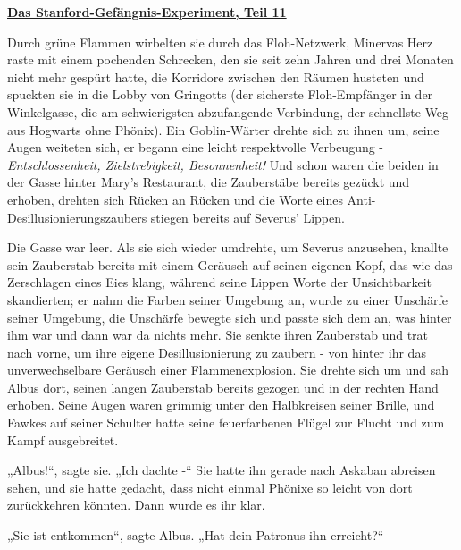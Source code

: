 

\hypertarget{das-stanford-gefuxe4ngnis-experiment-teil-11}{%

\textbf{\uline{Das Stanford-Gefängnis-Experiment, Teil 11}}

\hfill\break Durch grüne Flammen wirbelten sie durch das Floh-Netzwerk, Minervas Herz raste mit einem pochenden Schrecken, den sie seit zehn Jahren und drei Monaten nicht mehr gespürt hatte, die Korridore zwischen den Räumen husteten und spuckten sie in die Lobby von Gringotts (der sicherste Floh-Empfänger in der Winkelgasse, die am schwierigsten abzufangende Verbindung, der schnellste Weg aus Hogwarts ohne Phönix). Ein Goblin-Wärter drehte sich zu ihnen um, seine Augen weiteten sich, er begann eine leicht respektvolle Verbeugung - \emph{Entschlossenheit, Zielstrebigkeit, Besonnenheit!} Und schon waren die beiden in der Gasse hinter Mary's Restaurant, die Zauberstäbe bereits gezückt und erhoben, drehten sich Rücken an Rücken und die Worte eines Anti-Desillusionierungszaubers stiegen bereits auf Severus' Lippen.

Die Gasse war leer. Als sie sich wieder umdrehte, um Severus anzusehen, knallte sein Zauberstab bereits mit einem Geräusch auf seinen eigenen Kopf, das wie das Zerschlagen eines Eies klang, während seine Lippen Worte der Unsichtbarkeit skandierten; er nahm die Farben seiner Umgebung an, wurde zu einer Unschärfe seiner Umgebung, die Unschärfe bewegte sich und passte sich dem an, was hinter ihm war und dann war da nichts mehr. Sie senkte ihren Zauberstab und trat nach vorne, um ihre eigene Desillusionierung zu zaubern - von hinter ihr das unverwechselbare Geräusch einer Flammenexplosion. Sie drehte sich um und sah Albus dort, seinen langen Zauberstab bereits gezogen und in der rechten Hand erhoben. Seine Augen waren grimmig unter den Halbkreisen seiner Brille, und Fawkes auf seiner Schulter hatte seine feuerfarbenen Flügel zur Flucht und zum Kampf ausgebreitet.

„Albus!“, sagte sie. „Ich dachte -“ Sie hatte ihn gerade nach Askaban abreisen sehen, und sie hatte gedacht, dass nicht einmal Phönixe so leicht von dort zurückkehren könnten. Dann wurde es ihr klar.

„Sie ist entkommen“, sagte Albus. „Hat dein Patronus ihn erreicht?“

}
